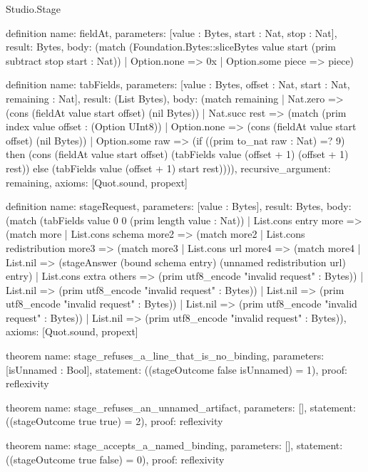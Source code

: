 \begin{lexlean}{Studio.Stage}
\begin{semanticmodule}
definition{
  name: fieldAt,
  parameters: [value : Bytes, start : Nat, stop : Nat],
  result: Bytes,
  body: (match (Foundation.Bytes::sliceBytes value start (prim subtract stop start : Nat))
    | Option.none => 0x
    | Option.some piece => piece)
}

definition{
  name: tabFields,
  parameters: [value : Bytes, offset : Nat, start : Nat, remaining : Nat],
  result: (List Bytes),
  body: (match remaining
    | Nat.zero => (cons (fieldAt value start offset) (nil Bytes))
    | Nat.succ rest => (match (prim index value offset : (Option UInt8))
      | Option.none => (cons (fieldAt value start offset) (nil Bytes))
      | Option.some raw => (if ((prim to_nat raw : Nat) =? 9) then (cons (fieldAt value start offset) (tabFields value (offset + 1) (offset + 1) rest)) else (tabFields value (offset + 1) start rest)))),
  recursive_argument: remaining,
  axioms: [Quot.sound, propext]
}

definition{
  name: stageRequest,
  parameters: [value : Bytes],
  result: Bytes,
  body: (match (tabFields value 0 0 (prim length value : Nat))
    | List.cons entry more => (match more
      | List.cons schema more2 => (match more2
        | List.cons redistribution more3 => (match more3
          | List.cons url more4 => (match more4
            | List.nil => (stageAnswer (bound schema entry) (unnamed redistribution url) entry)
            | List.cons extra others => (prim utf8_encode "invalid request" : Bytes))
          | List.nil => (prim utf8_encode "invalid request" : Bytes))
        | List.nil => (prim utf8_encode "invalid request" : Bytes))
      | List.nil => (prim utf8_encode "invalid request" : Bytes))
    | List.nil => (prim utf8_encode "invalid request" : Bytes)),
  axioms: [Quot.sound, propext]
}

theorem{
  name: stage_refuses_a_line_that_is_no_binding,
  parameters: [isUnnamed : Bool],
  statement: ((stageOutcome false isUnnamed) = 1),
  proof: reflexivity{}
}

theorem{
  name: stage_refuses_an_unnamed_artifact,
  parameters: [],
  statement: ((stageOutcome true true) = 2),
  proof: reflexivity{}
}

theorem{
  name: stage_accepts_a_named_binding,
  parameters: [],
  statement: ((stageOutcome true false) = 0),
  proof: reflexivity{}
}
\end{semanticmodule}
\end{lexlean}
